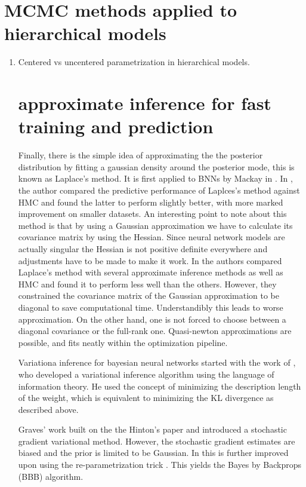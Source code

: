 \documentclass[]{report}
\begin{document}
\section{MCMC methods applied to hierarchical models}
\begin{enumerate}
\item Centered vs uncentered parametrization in hierarchical models.







\section{approximate inference for fast training and prediction}


Finally, there is the simple idea of approximating the the posterior
distribution by fitting a gaussian density around the posterior mode, this is
known as Laplace's method. It is first applied to BNNs by Mackay in \cite{mackay1992evidence}. In \cite{vivarelli2001comparing}, the author compared the predictive performance of Laplces's method against HMC and found the latter to perform slightly better, with more marked improvement on smaller datasets. An interesting point to note about this method is that by using a Gaussian approximation we have to calculate its covariance matrix by using the Hessian. Since neural network models are actually singular the Hessian is not positive definite everywhere and adjustments have to be made to make it work. In \cite{hernandez2015probabilistic} the authors compared Laplace's method with several approximate inference methods as well as HMC and found it to perform less well than the others. However, they constrained the covariance matrix of the Gaussian approximation to be diagonal to save computational time. Understandibly this leads to worse approximation. On the other hand, one is not forced to choose between a diagonal covariance or the full-rank one. Quasi-newton approximations are possible, and fits neatly within the optimization pipeline.

Variationa inference for bayesian neural networks started with the work of \cite{hinton1993keeping}, who developed a variational inference algorithm using the language of information theory. He used the concept of minimizing the description length of the weight, which is equivalent to minimizing the KL divergence as described above. 

Graves' work \cite{graves2011practical} built on the the Hinton's paper and introduced a stochastic gradient variational method. However, the stochastic gradient estimates are biased and the prior is limited to be Gaussian. In \cite{blundell2015weight} this is further improved upon using the re-parametrization trick \cite{opper2009variational,kingma2013auto,rezende2014stochastic}. This yields the Bayes by Backprops (BBB) algorithm.


\end{enumerate}
\end{document}
